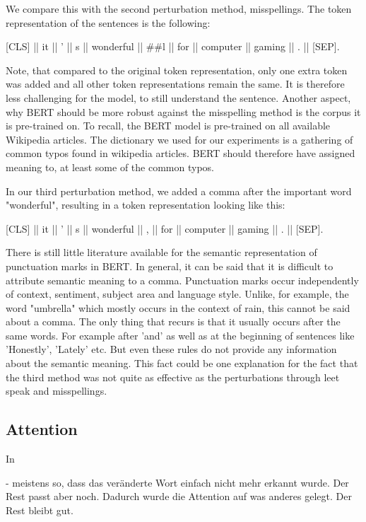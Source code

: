 We compare this with the second perturbation method, misspellings. The token representation of the sentences is the following:

{[}CLS{]}  ||  it  ||  '  ||  s  ||  wonderful  ||  \#\#l  ||  for  ||  computer  ||  gaming  ||  .  ||  {[}SEP{]}.

Note, that compared to the original token representation, only one extra token was added and all other token representations remain the same. It is therefore less challenging for the model, to still understand the sentence. Another aspect, why BERT should be more robust against the misspelling method is the corpus it is pre-trained on. To recall, the BERT model is pre-trained on all available Wikipedia articles. The dictionary we used for our experiments is a gathering of common typos found in wikipedia articles. BERT should therefore have assigned meaning to, at least some of the common typos.


In our third perturbation method, we added a comma after the important word "wonderful", resulting in a token representation looking like this:

{[}CLS{]}  ||  it  ||  '  ||  s  ||  wonderful  || , ||  for  ||  computer  ||  gaming  ||  .  ||  {[}SEP{]}.

There is still little literature available for the semantic representation of punctuation marks in BERT. In general, it can be said that it is difficult to attribute semantic meaning to a comma. Punctuation marks occur independently of context, sentiment, subject area and language style. Unlike, for example, the word "umbrella" which mostly occurs in the context of rain, this cannot be said about a comma. The only thing that recurs is that it usually occurs after the same words. For example after 'and' as well as at the beginning of sentences like 'Honestly', 'Lately' etc. But even these rules do not provide any information about the semantic meaning. This fact could be one explanation for the fact that the third method was not quite as effective as the perturbations through leet speak and misspellings.


\subsection{Attention}
In 


- meistens so, dass das veränderte Wort einfach nicht mehr erkannt wurde. Der Rest passt aber noch. Dadurch wurde die Attention auf was anderes gelegt. Der Rest bleibt gut.


